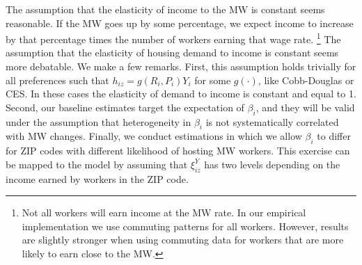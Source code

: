 The assumption that the elasticity of income to the MW is constant seems 
reasonable.
If the MW goes up by some percentage, we expect income to increase by that
percentage times the number of workers earning that wage rate.%
\footnote{Not all workers will earn income at the MW rate. In our empirical
implementation we use commuting patterns for all workers.
However, results are slightly stronger when using commuting data for workers that 
are more likely to earn close to the MW.}
The assumption that the elasticity of housing demand to income is constant 
seems more debatable.
We make a few remarks.
First, this assumption holds trivially for all preferences such that 
$h_{iz} = g\left(R_i, P_i\right) Y_i$ for some $g\left(\cdot\right)$, 
like Cobb-Douglas or CES.
In these cases the elasticity of demand to income is constant and equal to 1. 
Second, our baseline estimates target the expectation of $\beta_i$, and they 
will be valid under the assumption that heterogeneity in $\beta_i$ is not 
systematically correlated with MW changes.
Finally, we conduct estimations in which we allow $\beta_i$ to differ for 
ZIP codes with different likelihood of hosting MW workers.
This exercise can be mapped to the model by assuming that $\xi^Y_{iz}$ has two
levels depending on the income earned by workers in the ZIP code.

